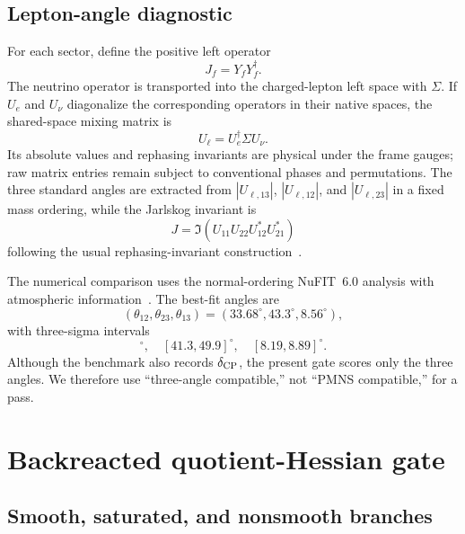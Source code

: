 \documentclass[11pt]{article}
\begin{document}
\subsection{Lepton-angle diagnostic}

For each sector, define the positive left operator
\begin{equation}
  J_f=Y_fY_f^\dagger.
\end{equation}
The neutrino operator is transported into the charged-lepton left space with $\Sigma$.  If $U_e$ and $U_\nu$ diagonalize the corresponding operators in their native spaces, the shared-space mixing matrix is
\begin{equation}
  U_{\ell}=U_e^\dagger\Sigma U_\nu.
  \label{eq:mixing}
\end{equation}
Its absolute values and rephasing invariants are physical under the frame gauges; raw matrix entries remain subject to conventional phases and permutations.  The three standard angles are extracted from $|U_{\ell,13}|$, $|U_{\ell,12}|$, and $|U_{\ell,23}|$ in a fixed mass ordering, while the Jarlskog invariant is
\begin{equation}
  J=\Im(U_{11}U_{22}U_{12}^*U_{21}^*)
  \label{eq:jarlskog}
\end{equation}
following the usual rephasing-invariant construction~\cite{KobayashiMaskawa1973,Jarlskog1985}.

The numerical comparison uses the normal-ordering NuFIT~6.0 analysis with atmospheric information~\cite{Esteban2024}.  The best-fit angles are
\begin{equation}
  (\theta_{12},\theta_{23},\theta_{13})=(33.68^\circ,43.3^\circ,8.56^\circ),
\end{equation}
with three-sigma intervals
\begin{equation}
  [31.63,35.95]^\circ,\quad [41.3,49.9]^\circ,\quad [8.19,8.89]^\circ.
  \label{eq:nufit-ranges}
\end{equation}
Although the benchmark also records $\delta_{\rm CP}$, the present gate scores only the three angles.  We therefore use ``three-angle compatible,'' not ``PMNS compatible,'' for a pass.

\section{Backreacted quotient-Hessian gate}
\label{sec:backreacted-results}

\subsection{Smooth, saturated, and nonsmooth branches}
\end{document}
